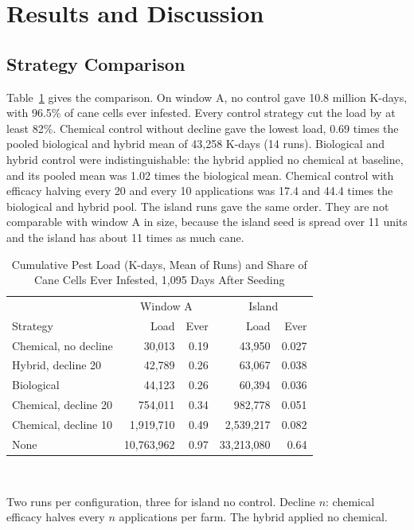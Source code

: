 \documentclass[conference]{IEEEtran}
\begin{document}
\section{Results and Discussion}

\subsection{Strategy Comparison}

Table~\ref{tab:main} gives the comparison. On window A, no control gave 10.8 million K-days, with 96.5\% of cane cells ever infested. Every control strategy cut the load by at least 82\%. Chemical control without decline gave the lowest load, 0.69 times the pooled biological and hybrid mean of 43,258 K-days (14 runs). Biological and hybrid control were indistinguishable: the hybrid applied no chemical at baseline, and its pooled mean was 1.02 times the biological mean. Chemical control with efficacy halving every 20 and every 10 applications was 17.4 and 44.4 times the biological and hybrid pool. The island runs gave the same order. They are not comparable with window A in size, because the island seed is spread over 11 units and the island has about 11 times as much cane.

\begin{table}[t]
\caption{Cumulative Pest Load (K-days, Mean of Runs) and Share of Cane Cells Ever Infested, 1,095 Days After Seeding}
\label{tab:main}
\centering
\footnotesize
\begin{tabular}{@{}lrrrr@{}}
\toprule
 & \multicolumn{2}{c}{Window A} & \multicolumn{2}{c}{Island} \\
Strategy & Load & Ever & Load & Ever \\
\midrule
Chemical, no decline & 30,013 & 0.19 & 43,950 & 0.027 \\
Hybrid, decline 20 & 42,789 & 0.26 & 63,067 & 0.038 \\
Biological & 44,123 & 0.26 & 60,394 & 0.036 \\
Chemical, decline 20 & 754,011 & 0.34 & 982,778 & 0.051 \\
Chemical, decline 10 & 1,919,710 & 0.49 & 2,539,217 & 0.082 \\
None & 10,763,962 & 0.97 & 33,213,080 & 0.64 \\
\bottomrule
\end{tabular}
\\[2pt]
\parbox{\columnwidth}{\footnotesize Two runs per configuration, three for island no control. Decline $n$: chemical efficacy halves every $n$ applications per farm. The hybrid applied no chemical.}
\end{table}
\end{document}
